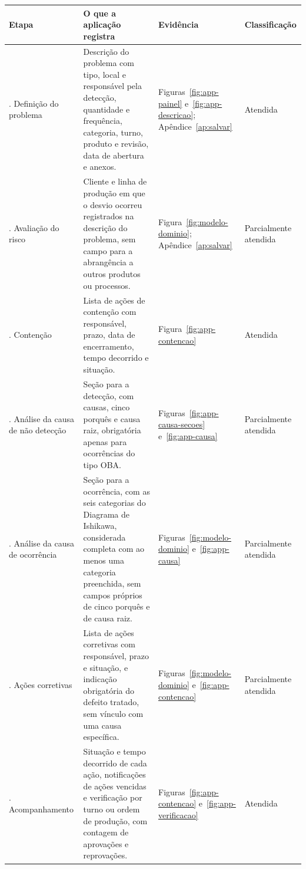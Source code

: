 \begin{quadro}[htb]
    \centering
    \caption{Aderência da aplicação às etapas do QRQC}
    \label{quad:aderencia}
    \footnotesize
    \begin{tabularx}{\textwidth}{|>{\raggedright\arraybackslash}p{2.9cm}
                                    |>{\raggedright\arraybackslash}X
                                    |>{\raggedright\arraybackslash}p{2.2cm}
                                    |>{\raggedright\arraybackslash}p{1.9cm}|}
        \hline
        \textbf{Etapa} & \textbf{O que a aplicação registra} & \textbf{Evidência} & \textbf{Classificação} \\
        \hline
        1. Definição do problema & Descrição do problema com tipo, local e responsável pela detecção, quantidade e frequência, categoria, turno, produto e revisão, data de abertura e anexos. & Figuras~\ref{fig:app-painel} e~\ref{fig:app-descricao}; Apêndice~\ref{ap:salvar} & Atendida \\
        \hline
        2. Avaliação do risco & Cliente e linha de produção em que o desvio ocorreu registrados na descrição do problema, sem campo para a abrangência a outros produtos ou processos. & Figura~\ref{fig:modelo-dominio}; Apêndice~\ref{ap:salvar} & Parcialmente atendida \\
        \hline
        3. Contenção & Lista de ações de contenção com responsável, prazo, data de encerramento, tempo decorrido e situação. & Figura~\ref{fig:app-contencao} & Atendida \\
        \hline
        4. Análise da causa de não detecção & Seção para a detecção, com causas, cinco porquês e causa raiz, obrigatória apenas para ocorrências do tipo OBA. & Figuras~\ref{fig:app-causa-secoes} e~\ref{fig:app-causa} & Parcialmente atendida \\
        \hline
        5. Análise da causa de ocorrência & Seção para a ocorrência, com as seis categorias do Diagrama de Ishikawa, considerada completa com ao menos uma categoria preenchida, sem campos próprios de cinco porquês e de causa raiz. & Figuras~\ref{fig:modelo-dominio} e~\ref{fig:app-causa} & Parcialmente atendida \\
        \hline
        6. Ações corretivas & Lista de ações corretivas com responsável, prazo e situação, e indicação obrigatória do defeito tratado, sem vínculo com uma causa específica. & Figuras~\ref{fig:modelo-dominio} e~\ref{fig:app-contencao} & Parcialmente atendida \\
        \hline
        7. Acompanhamento & Situação e tempo decorrido de cada ação, notificações de ações vencidas e verificação por turno ou ordem de produção, com contagem de aprovações e reprovações. & Figuras~\ref{fig:app-contencao} e~\ref{fig:app-verificacao} & Atendida \\

\end{tabularx}
\end{quadro}
